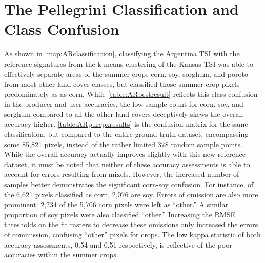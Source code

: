 \section{The Pellegrini Classification and Class Confusion}

As shown in \autoref{map:ARclassification}, classifying the Argentina TSI with the reference signatures from the k-means clustering of the Kansas TSI was able to effectively separate areas of the summer crops corn, soy, sorghum, and poroto from most other land cover classes, but classified those summer crop pixels predominately as as corn. While \autoref{table:ARbestresult} reflects this class confusion in the producer and user accuracies, the low sample count for corn, soy, and sorghum compared to all the other land covers deceptively skews the overall accuracy higher. \autoref{table:ARpurepxresults} is the confusion matrix for the same classification, but compared to the entire ground truth dataset, encompassing some 85,821 pixels, instead of the rather limited 378 random sample points. While the overall accuracy actually improves slightly with this new reference dataset, it must be noted that neither of these accuracy assessments is able to account for errors resulting from mixels. However, the increased number of samples better demonstrates the significant corn-soy confusion. For instance, of the 6,621 pixels classified as corn, 2,076 are soy. Errors of omission are also more prominent: 2,234 of the 5,706 corn pixels were left as ``other.'' A similar proportion of soy pixels were also classified ``other.'' Increasing the RMSE thresholds on the fit rasters to decrease these omissions only increased the errors of commission, confusing ``other'' pixels for crops. The low kappa statistic of both accuracy assessments, 0.54 and 0.51 respectively, is reflective of the poor accuracies within the summer crops.

